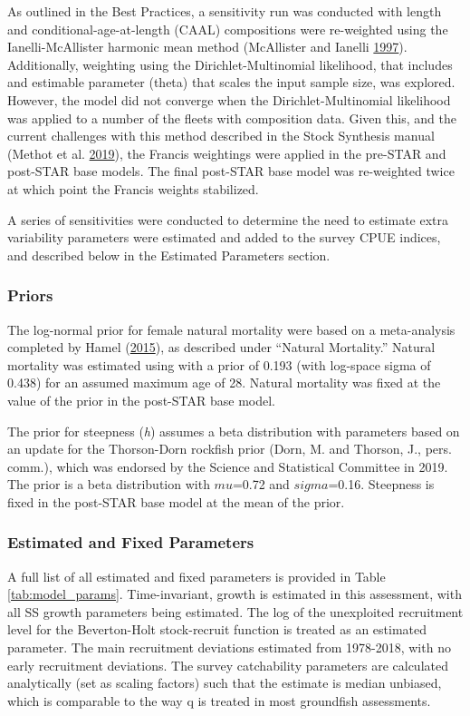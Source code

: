 \documentclass[12pt,]{article}
\begin{document}
As outlined in the Best Practices, a sensitivity run was conducted with
length and conditional-age-at-length (CAAL) compositions were
re-weighted using the Ianelli-McAllister harmonic mean method
(McAllister and Ianelli \protect\hyperlink{ref-McAllister1997}{1997}).
Additionally, weighting using the Dirichlet-Multinomial likelihood, that
includes and estimable parameter (theta) that scales the input sample
size, was explored. However, the model did not converge when the
Dirichlet-Multinomial likelihood was applied to a number of the fleets
with composition data. Given this, and the current challenges with this
method described in the Stock Synthesis manual (Methot et al.
\protect\hyperlink{ref-Methot2019}{2019}), the Francis weightings were
applied in the pre-STAR and post-STAR base models. The final post-STAR
base model was re-weighted twice at which point the Francis weights
stabilized.

A series of sensitivities were conducted to determine the need to
estimate extra variability parameters were estimated and added to the
survey CPUE indices, and described below in the Estimated Parameters
section.

\subsubsection{Priors}\label{priors}

The log-normal prior for female natural mortality were based on a
meta-analysis completed by Hamel
(\protect\hyperlink{ref-Hamel2015}{2015}), as described under ``Natural
Mortality.'' Natural mortality was estimated using with a prior of 0.193
(with log-space sigma of 0.438) for an assumed maximum age of 28.
Natural mortality was fixed at the value of the prior in the post-STAR
base model.

The prior for steepness (\emph{h}) assumes a beta distribution with
parameters based on an update for the Thorson-Dorn rockfish prior (Dorn,
M. and Thorson, J., pers. comm.), which was endorsed by the Science and
Statistical Committee in 2019. The prior is a beta distribution with
\(mu\)=0.72 and \(sigma\)=0.16. Steepness is fixed in the post-STAR base
model at the mean of the prior.

\subsubsection{Estimated and Fixed
Parameters}\label{estimated-and-fixed-parameters}

A full list of all estimated and fixed parameters is provided in Table
\ref{tab:model_params}. Time-invariant, growth is estimated in this
assessment, with all SS growth parameters being estimated. The log of
the unexploited recruitment level for the Beverton-Holt stock-recruit
function is treated as an estimated parameter. The main recruitment
deviations estimated from 1978-2018, with no early recruitment
deviations. The survey catchability parameters are calculated
analytically (set as scaling factors) such that the estimate is median
unbiased, which is comparable to the way q is treated in most groundfish
assessments.
\end{document}
